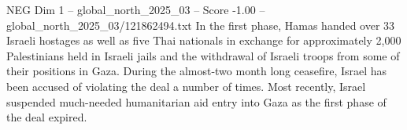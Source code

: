 \begin{textsample}{NEG Dim 1 – global\_north\_2025\_03 – Score -1.00 – global\_north\_2025\_03/121862494.txt}
In the first phase, Hamas handed over 33 Israeli hostages as well as five Thai nationals in exchange for approximately 2,000 Palestinians held in Israeli jails and the withdrawal of Israeli troops from some of their positions in Gaza.
During the almost-two month long ceasefire, Israel has been accused of violating the deal a number of times.
Most recently, Israel suspended much-needed humanitarian aid entry into Gaza as the first phase of the deal expired.

\end{textsample}
